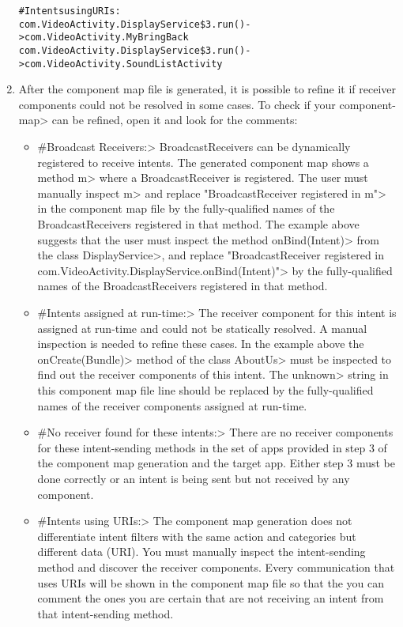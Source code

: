 \begin{enumerate}
\begin{alltt}
#Intents using URIs:
com.VideoActivity.DisplayService\$3.run() -> com.VideoActivity.MyBringBack
com.VideoActivity.DisplayService\$3.run() -> com.VideoActivity.SoundListActivity

\end{alltt}
\item
After the component map file is generated, it is possible to refine it if
receiver components could not be resolved in some cases. To check if your
\<component-map> can be refined, open it and look for the comments:
\begin{itemize}
\item
\<\#Broadcast Receivers:> BroadcastReceivers can be dynamically registered to
receive intents. The generated component map shows a method \<m> where a
BroadcastReceiver is registered. The user must manually inspect \<m> and replace
\<"BroadcastReceiver registered in m"> in the component map file by the
fully-qualified names of the BroadcastReceivers
registered in that method. The example above suggests that the user must inspect
the method \<onBind(Intent)> from the class \<DisplayService>, and replace
\<"BroadcastReceiver registered in
com.VideoActivity.DisplayService.onBind(Intent)"> by the fully-qualified names of
the BroadcastReceivers registered in that method.
\item
\<\#Intents assigned at run-time:> The receiver component for this intent is
assigned at run-time and could not be statically resolved. A manual inspection
is needed to refine these cases. In the example above the \<onCreate(Bundle)>
method of the class \<AboutUs> must be inspected to find out the receiver
components of this intent. The \<unknown> string in this component map file line
should be replaced by the fully-qualified names of the receiver components
assigned at run-time.
\item
\<\#No receiver found for these intents:> There are no receiver components for
these intent-sending methods in the set of apps provided in step 3 of the
component map generation and the target app. Either step 3 must be done
correctly or an intent is being sent but not received by any component.
\item
\<\#Intents using URIs:> The component map generation does not differentiate
intent filters with the same action and categories but different data (URI).
You must manually inspect the intent-sending method and discover the receiver
components. Every communication that uses URIs will be shown in the component
map file so that the you can comment the ones you are certain that are not
receiving an intent from that intent-sending method.
\end{itemize}
\end{enumerate}

